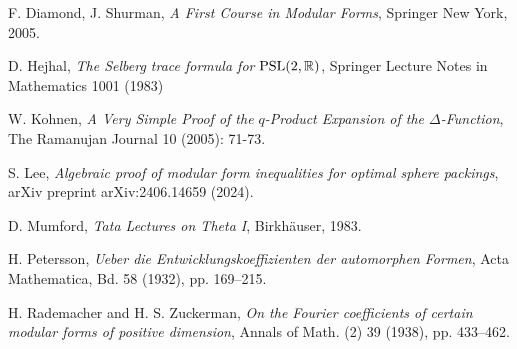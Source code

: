 \begin{thebibliography}{20}

 {\sc F. Diamond, J. Shurman}, \emph{A First Course in Modular Forms}, Springer New York, 2005.



 {\sc D. Hejhal}, {\em The Selberg trace formula for $\mathrm{PSL}(2, \mathbb{R})$},  Springer Lecture Notes in Mathematics 1001 (1983)


 {\sc W. Kohnen}, {\em A Very Simple Proof of the $q$-Product Expansion of the $\Delta$-Function}, The Ramanujan Journal 10 (2005): 71-73.

 {\sc S. Lee}, {\em Algebraic proof of modular form inequalities for optimal sphere packings}, arXiv preprint arXiv:2406.14659 (2024).

 {\sc D. Mumford}, {\em Tata Lectures on Theta I}, Birkh\"auser, 1983.



 {\sc H. Petersson}, {\em Ueber die Entwicklungskoeffizienten der automorphen Formen}, Acta Mathematica, Bd. 58 (1932),  pp. 169--215.


 {\sc H. Rademacher and H. S. Zuckerman}, {\em On the Fourier coefficients of certain modular forms of
positive dimension}, Annals of Math. (2) 39 (1938),  pp. 433--462.


\end{thebibliography}
